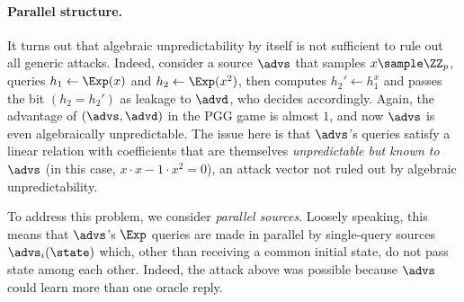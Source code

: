 {\begin{itemize}
\fi

\iffalse
\paragraph*{Parallel structure.}
It turns out that algebraic unpredictability by itself is not sufficient to rule out all generic attacks. Indeed, consider a source $\advs$ that samples $x \sample \ZZ_p$, queries $h_1 \gets \Exp(x)$ and $h_2 \gets \Exp(x^2)$, then computes \mbox{$h_2' \gets h_1^x$} and passes the bit $(h_2 = h_2')$ as leakage to $\advd$, who decides accordingly. Again, the advantage of $(\advs, \advd)$ in the PGG game is almost $1$, and now $\advs$ is even algebraically unpredictable. The issue here is that $\advs$'s queries satisfy a linear relation with coefficients that are themselves \emph{unpredictable but known to $\advs$} (in this case, $x \cdot x - 1 \cdot x^2 = 0$), an attack vector not ruled out by algebraic unpredictability. 

To address this problem, we consider \emph{parallel sources}. Loosely speaking, this means that $\advs$'s $\Exp$ queries are made in parallel by single-query sources $\advs_i(\state)$ which, other than receiving a common initial state, do not pass state among each other.
Indeed, the attack above was possible because $\advs$ could learn more than one oracle reply. %



\end{itemize}}
